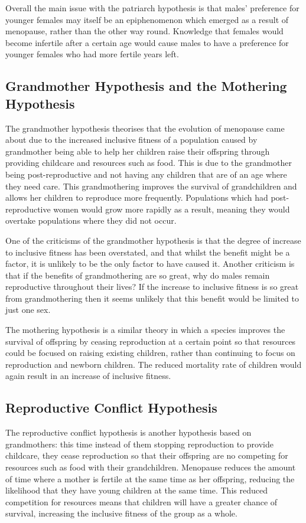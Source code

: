 \documentclass[authoryearcitations]{UoYCSproject}
\begin{document}
Overall the main issue with the patriarch hypothesis is that males' preference for younger females may itself be an epiphenomenon which emerged as a result of menopause, rather than the other way round. Knowledge that females would become infertile after a certain age would cause males to have a preference for younger females who had more fertile years left.

\subsection{Grandmother Hypothesis and the Mothering Hypothesis}
The grandmother hypothesis \cite{grandmother2000, grandmotheringProbabilistic2014, longevityGrandmother2012} theorises that the evolution of menopause came about due to the increased inclusive fitness of a population caused by grandmother being able to help her children raise their offspring through providing childcare and resources such as food. This is due to the grandmother being post-reproductive and not having any children that are of an age where they need care. This grandmothering improves the survival of grandchildren and allows her children to reproduce more frequently. Populations which had post-reproductive women would grow more rapidly as a result, meaning they would overtake populations where they did not occur. 

One of the criticisms of the grandmother hypothesis is that the degree of increase to inclusive fitness has been overstated, and that whilst the benefit might be a factor, it is unlikely to be the only factor to have caused it. Another criticism is that if the benefits of grandmothering are so great, why do males remain reproductive throughout their lives? If the increase to inclusive fitness is so great from grandmothering then it seems unlikely that this benefit would be limited to just one sex.

The mothering hypothesis is a similar theory in which a species improves the survival of offspring by ceasing reproduction at a certain point so that resources could be focused on raising existing children, rather than continuing to focus on reproduction and newborn children. The reduced mortality rate of children would again result in an increase of inclusive fitness.

\subsection{Reproductive Conflict Hypothesis}
The reproductive conflict hypothesis \cite{cant2008reproductive, repConflictOrca2017} is another hypothesis based on grandmothers: this time instead of them stopping reproduction to provide childcare, they cease reproduction so that their offspring are no competing for resources such as food with their grandchildren. Menopause reduces the amount of time where a mother is fertile at the same time as her offspring, reducing the likelihood that they have young children at the same time. This reduced competition for resources means that children will have a greater chance of survival, increasing the inclusive fitness of the group as a whole.
\end{document}
